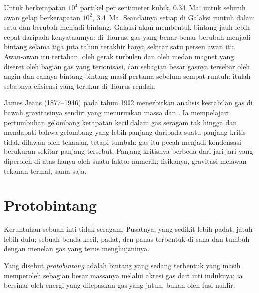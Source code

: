 Untuk  berkerapatan $10^4$ partikel per sentimeter kubik, 
\qty{0.34}{Ma}; untuk seluruh awan gelap berkerapatan $10^2$, \qty{3.4}{Ma}. Seandainya setiap
 di Galaksi runtuh dalam satu  dan berubah menjadi
bintang, Galaksi akan membentuk bintang jauh lebih cepat daripada kenyataannya: di Taurus, gas yang benar-benar berubah
menjadi bintang selama tiga juta tahun terakhir hanya sekitar satu persen awan itu.
Awan-awan itu tertahan, oleh gerak turbulen dan oleh medan magnet yang diseret oleh
bagian gas yang terionisasi, dan sebagian besar gasnya tersebar oleh
angin dan cahaya bintang-bintang masif pertama sebelum sempat runtuh: itulah sebabnya
efisiensi yang terukur di Taurus rendah.

\begin{history}
James Jeans (1877--1946) pada tahun 1902 menerbitkan analisis kestabilan gas di bawah
gravitasinya sendiri yang menurunkan massa dan . Ia
mempelajari pertumbuhan gelombang kerapatan kecil dalam gas seragam tak hingga dan
mendapati bahwa gelombang yang lebih panjang daripada suatu panjang kritis tidak dilawan
oleh tekanan, tetapi tumbuh: gas itu pecah menjadi kondensasi berukuran sekitar panjang
tersebut. Panjang kritisnya berbeda dari jari-jari yang diperoleh di atas hanya oleh
suatu faktor numerik; fisikanya, gravitasi melawan tekanan termal, sama saja.
\end{history}

\section{Protobintang}

Keruntuhan sebuah inti tidak seragam. Pusatnya, yang sedikit lebih padat, jatuh lebih dulu;
sebuah benda kecil, padat, dan panas terbentuk di sana dan tumbuh dengan menelan gas yang
terus menghujaninya.

\begin{definition}[Protobintang]\label{def:b2:ism-star-formation:protostar}
Yang disebut \emph{protobintang} adalah bintang yang sedang terbentuk
yang masih memperoleh sebagian besar massanya melalui akresi gas dari inti induknya;
ia bersinar oleh energi yang dilepaskan gas yang jatuh, bukan oleh fusi nuklir.
\end{definition}

